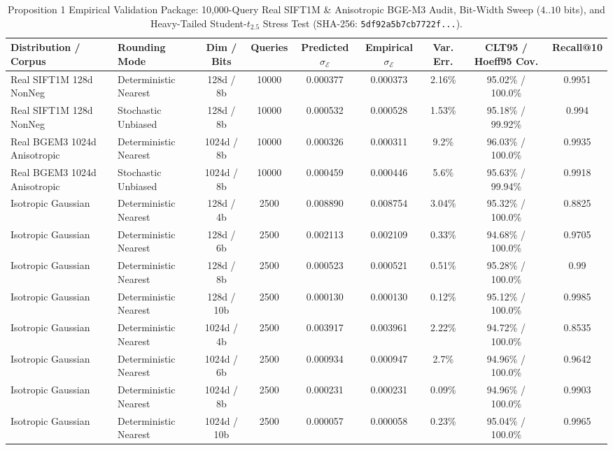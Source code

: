 \documentclass[10pt,journal,compsoc]{IEEEtran}
\begin{document}
\begin{table}[!htbp]\centering\scriptsize
\caption{Proposition 1 Empirical Validation Package: 10,000-Query Real SIFT1M \& Anisotropic BGE-M3 Audit, Bit-Width Sweep ($4..10$ bits), and Heavy-Tailed Student-$t_{2.5}$ Stress Test (SHA-256: \texttt{5df92a5b7cb7722f...}).}
\begin{tabular}{@{}llccccccc@{}}\toprule
\textbf{Distribution / Corpus} & \textbf{Rounding Mode} & \textbf{Dim / Bits} & \textbf{Queries} & \textbf{Predicted $\sigma_{\mathcal{E}}$} & \textbf{Empirical $\sigma_{\mathcal{E}}$} & \textbf{Var. Err.} & \textbf{CLT95 / Hoeff95 Cov.} & \textbf{Recall@10} \\\midrule
Real SIFT1M 128d NonNeg & Deterministic Nearest & 128d / 8b & 10000 & 0.000377 & 0.000373 & 2.16\% & 95.02\% / 100.0\% & 0.9951 \\
Real SIFT1M 128d NonNeg & Stochastic Unbiased & 128d / 8b & 10000 & 0.000532 & 0.000528 & 1.53\% & 95.18\% / 99.92\% & 0.994 \\
Real BGEM3 1024d Anisotropic & Deterministic Nearest & 1024d / 8b & 10000 & 0.000326 & 0.000311 & 9.2\% & 96.03\% / 100.0\% & 0.9935 \\
Real BGEM3 1024d Anisotropic & Stochastic Unbiased & 1024d / 8b & 10000 & 0.000459 & 0.000446 & 5.6\% & 95.63\% / 99.94\% & 0.9918 \\
Isotropic Gaussian & Deterministic Nearest & 128d / 4b & 2500 & 0.008890 & 0.008754 & 3.04\% & 95.32\% / 100.0\% & 0.8825 \\
Isotropic Gaussian & Deterministic Nearest & 128d / 6b & 2500 & 0.002113 & 0.002109 & 0.33\% & 94.68\% / 100.0\% & 0.9705 \\
Isotropic Gaussian & Deterministic Nearest & 128d / 8b & 2500 & 0.000523 & 0.000521 & 0.51\% & 95.28\% / 100.0\% & 0.99 \\
Isotropic Gaussian & Deterministic Nearest & 128d / 10b & 2500 & 0.000130 & 0.000130 & 0.12\% & 95.12\% / 100.0\% & 0.9985 \\
Isotropic Gaussian & Deterministic Nearest & 1024d / 4b & 2500 & 0.003917 & 0.003961 & 2.22\% & 94.72\% / 100.0\% & 0.8535 \\
Isotropic Gaussian & Deterministic Nearest & 1024d / 6b & 2500 & 0.000934 & 0.000947 & 2.7\% & 94.96\% / 100.0\% & 0.9642 \\
Isotropic Gaussian & Deterministic Nearest & 1024d / 8b & 2500 & 0.000231 & 0.000231 & 0.09\% & 94.96\% / 100.0\% & 0.9903 \\
Isotropic Gaussian & Deterministic Nearest & 1024d / 10b & 2500 & 0.000057 & 0.000058 & 0.23\% & 95.04\% / 100.0\% & 0.9965 \\

\end{tabular}
\end{table}
\end{document}
